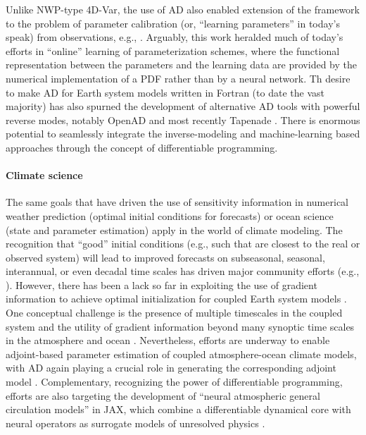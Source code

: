 Unlike NWP-type 4D-Var, the use of AD also enabled extension of the framework to the problem of parameter calibration (or, ``learning parameters'' in today's speak) from observations, e.g., \cite{Ferreira.2005,Stammer:2005dw,Liu:2012jd}. Arguably, this work heralded much of today's efforts in ``online'' learning of parameterization schemes, where the functional representation between the parameters and the learning data are provided by the numerical implementation of a PDF rather than by a neural network.
Th desire to make AD for Earth system models written in Fortran (to date the vast majority) has also spurned the development of alternative AD tools with powerful reverse modes, notably OpenAD \cite{Utke:2008ko} and most recently Tapenade \cite{Hascoet.2013,Gaikwad.2023,Gaikwad.2024}.
There is enormous potential to seamlessly integrate the inverse-modeling and machine-learning based approaches through the concept of differentiable programming.

\paragraph{Climate science}

The same goals that have driven the use of sensitivity information in numerical weather prediction (optimal initial conditions for forecasts) or ocean science (state and parameter estimation) apply in the world of climate modeling.
The recognition that ``good'' initial conditions (e.g., such that are closest to the real or observed system) will lead to improved forecasts on subseasonal, seasonal, interannual, or even decadal time scales has driven major community efforts (e.g., \cite{Meehl.2021}). However, there has been a lack so far in exploiting the use of gradient information to achieve optimal initialization for coupled Earth system models \cite{Frolov.2023}. 
One conceptual challenge is the presence of multiple timescales in the coupled system and the utility of gradient information beyond many synoptic time scales in the atmosphere and ocean \cite{Lea:2000gv,Lea:2002cv}.
Nevertheless, efforts are underway to enable adjoint-based parameter estimation of coupled atmosphere-ocean climate models, with AD again playing a crucial role in generating the corresponding adjoint model
\cite{Blessing.2014,Lyu.2018,Stammer:2018de}.
Complementary, recognizing the power of differentiable programming, efforts are also targeting the development of ``neural atmospheric general circulation models'' in JAX, which combine a differentiable dynamical core with neural operators as surrogate models of unresolved physics
\cite{Kochkov.2023}.


